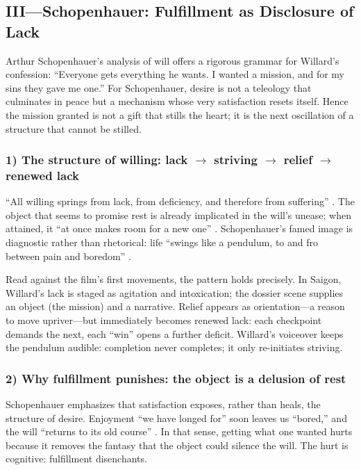 \subsection*{III—Schopenhauer: Fulfillment as Disclosure of Lack}
\label{ssec:iii-schopenhauer}
Arthur Schopenhauer's analysis of will offers a rigorous grammar for Willard's confession:
``Everyone gets everything he wants. I wanted a mission, and for my sins they gave me one.''
For Schopenhauer, desire is not a teleology that culminates in peace but a mechanism whose
very satisfaction resets itself. Hence the mission granted is not a gift that stills the heart;
it is the next oscillation of a structure that cannot be stilled.

\subsubsection*{1) The structure of willing: lack $\rightarrow$ striving
	$\rightarrow$ relief $\rightarrow$ renewed lack}

``All willing springs from lack, from deficiency, and therefore from suffering''
\parencite[p.~196]{SchopenhauerWWR1969}. The object that seems to promise rest is already
implicated in the will's unease; when attained, it ``at once makes room for a new one''
\parencite[p.~319]{SchopenhauerWWR1969}. Schopenhauer's famed image is diagnostic rather
than rhetorical: life ``swings like a pendulum, to and fro between pain and boredom''
\parencite[p.~312]{SchopenhauerWWR1969}.

Read against the film's first movements, the pattern holds precisely. In Saigon, Willard's
lack is staged as agitation and intoxication; the dossier scene supplies an object (the mission)
and a narrative. Relief appears as orientation—a reason to move upriver—but immediately becomes
renewed lack: each checkpoint demands the next, each ``win'' opens a further deficit.
Willard's voiceover keeps the pendulum audible: completion never completes; it only
re-initiates striving.

\subsubsection*{2) Why fulfillment punishes: the object is a delusion of rest}

Schopenhauer emphasizes that satisfaction exposes, rather than heals, the structure of desire.
Enjoyment ``we have longed for'' soon leaves us ``bored,'' and the will ``returns to its old
course'' \parencite[p.~319]{SchopenhauerWWR1969}. In that sense, getting what one wanted hurts
because it removes the fantasy that the object could silence the will. The hurt is cognitive:
fulfillment disenchants.

